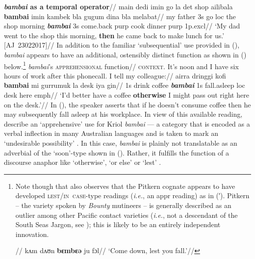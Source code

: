 \pex{}\begingl\glpreamble \textbf{\textit{bambai} as a temporal operator}//
\gla main dedi imin go la det shop ailibala \textbf{bambai} imin kambek bla gugum dina bla melabat//
\glb my father 3s go {\sc loc} the shop morning \textit{\textbf{bambai}} 3s come.back {\sc purp} cook dinner {\sc purp} 1p{\sc.excl}//
\glft`My dad went to the shop this morning, \textbf{then} he came back to make lunch for us.' \hspace*{\fill}[AJ~23022017]//
\endgl\xe
In addition to the familiar `subsequential' use provided in (), \textit{bambai} appears to have an additional, ostensibly distinct function as shown in () below.\footnote{
	Note though that \citeauthor{Clark1979} also observes that the Pitkern cognate appears to have developed \textsc{lest/in~case}-type readings (\textit{i.e.}, an \gls{appr} reading) as in (′). Pitkern -- the variety spoken by \textit{Bounty} mutineers -- is generally described as an outlier among other Pacific contact varieties (\textit{i.e.}, not a descendant of the South Seas Jargon, see \citealp[48]{Clark1979}); this is likely to be an entirely independent innovation.\label{PN footnote}

\pex[aboveglftskip=0ex,exno=\getref{app0}′]\begingl\glpreamble{}//
\gla kʌm dʌʊn \textbf{bɛmbɛǝ} ju  fɔl//
\glft`Come down, lest you fall.'//\endgl
\xe

}
\pex
\begingl\glpreamble \textit{bambai}'s \textsc{apprehensional} function//
\glpreamble\textsc{context.}  It's noon and I have six hours of work after this phonecall. I tell my colleague://
\gla ai\textdblhyphen{}rra dringgi kofi \textbf{bambai} mi gurrumuk la desk iya gin//
\glb 1s drink coffee \textit{\textbf{bambai}} 1s fall.asleep {\sc loc} desk here {\sc emph}//
\glft `I'd better have a coffee \textbf{otherwise} I might pass out right here on the desk.'\trailingcitation{[GT~28052016]}//
\endgl
\xe
In (), the speaker asserts that if he doesn't consume coffee then he may subsequently fall asleep at his workplace. In view of this available reading, \citeauthor{Angelo2016} describe an `apprehensive' use for Kriol \textit{bambai} --- a category that is encoded as a verbal inflection in many Australian languages and is taken to mark an `undesirable possibility' \citeyearpar[256]{Angelo2016}. In this case, \textit{bambai} is plainly not translatable as an adverbial of the `soon'-type shown in (). Rather, it fulfills the function of a discourse anaphor like `otherwise', `or else' or `lest' \citep[see also][]{Webber2001,PhilKotek}.

